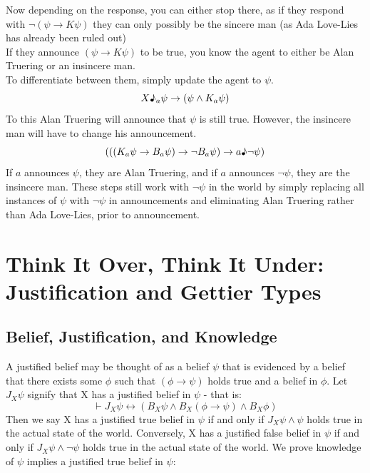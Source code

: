 \documentclass[12pt, titlepage, twoside, a4paper]{report}
\begin{document}
\newline \newline \newline \newline \newline \newline \newline \newline \newline
Now depending on the response, you can either stop there, as if they respond with $\neg (\psi \to K\psi)$ they can only possibly be the sincere man (as Ada Love-Lies has already been ruled out)\\
If they announce $(\psi \to K\psi)$ to be true, you know the agent to either be Alan Truering or an insincere man.\\
To differentiate between them, simply update the agent to $\psi$.
$$X\text{\textmusicalnote}_a \psi \to (\psi \wedge K_a \psi)$$
To this Alan Truering will announce that $\psi$ is still true. However, the insincere man will have to change his announcement.
$$(((K_a \psi \to B_a \psi ) \to \neg B_a \psi) \to a \text{\textmusicalnote} \neg \psi)$$
If $a$ announces $\psi$, they are Alan Truering, and if $a$ announces $\neg \psi$, they are the insincere man. These steps still work with $\neg \psi$ in the world by simply replacing all instances of $\psi$ with $\neg \psi$ in announcements and eliminating Alan Truering rather than Ada Love-Lies, prior to announcement.

\chapter{Think It Over, Think It Under: Justification and Gettier Types}
\section{Belief, Justification, and Knowledge}
A justified belief may be thought of as a belief $\psi$ that is evidenced by a belief that there exists some $\phi$ such that $(\phi \to \psi)$ holds true and a belief in $\phi$. Let $J_X\psi$ signify that X has a justified belief in $\psi$ - that is:
$$\vdash J_X\psi \leftrightarrow (B_X \psi \wedge B_X(\phi \to \psi) \wedge B_X \phi)$$ 
Then we say X has a justified true belief in $\psi$ if and only if $J_X\psi \wedge \psi$ holds true in the actual state of the world. Conversely, X has a justified false belief in $\psi$ if and only if $J_X\psi \wedge \neg \psi$ holds true in the actual state of the world. 
We prove knowledge of $\psi$ implies a justified true belief in $\psi$:
\end{document}
